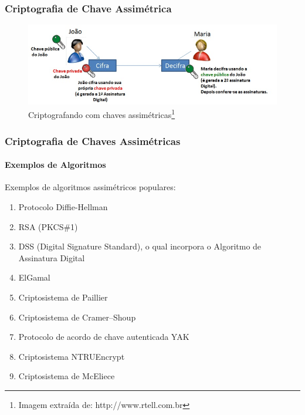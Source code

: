 \documentclass[compress]{beamer}
\begin{document}
\begin{frame}
\frametitle{Criptografia de Chave Assimétrica}
	\begin{figure}[h]
		\includegraphics[width=\textwidth]{pics/chave_assimetrica_1}
		\caption{Criptografando com chaves assimétricas\footnote{Imagem extraída de: http://www.rtell.com.br}}
	\end{figure}
\end{frame}


\begin{frame}
\frametitle{Criptografia de Chaves Assimétricas}
\framesubtitle{Exemplos de Algoritmos}
\justifying Exemplos de algoritmos assimétricos populares:
	\begin{enumerate}
		\item {Protocolo Diffie-Hellman}
		\item {RSA (PKCS\#1)}
		\item {DSS (Digital Signature Standard), o qual incorpora o Algoritmo de Assinatura Digital}
		\item {ElGamal}
		\item {Criptosistema de Paillier}		
		\item {Criptosistema de Cramer–Shoup}
		\item {Protocolo de acordo de chave autenticada YAK}
		\item {Criptosistema NTRUEncrypt}
		\item {Criptosistema de McEliece}
	\end{enumerate}
\end{frame}
\end{document}
